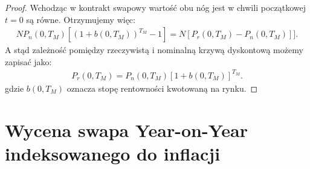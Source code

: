 \documentclass{mini}
\theoremstyle{mythstyle}
\begin{document}
	\begin{proof}
		Wchodząc w kontrakt swapowy wartość obu nóg jest w chwili początkowej $t = 0$ są równe. Otrzymujemy więc:
		\begin{eqnarray*}
			N P_n(0,T_M)[(1 + b(0,T_M))^{T_M} - 1] = N [P_r(0,T_M) - P_n(0,T_M)]].
		\end{eqnarray*}
		A stąd zależność pomiędzy rzeczywistą i nominalną krzywą dyskontową możemy zapisać jako:
		\begin{eqnarray}
		P_r(0,T_M) = P_n(0,T_M)[1 + b(0,T_M)]^{T_M}.
		\end{eqnarray}
		gdzie $b(0,T_M)$ oznacza stopę rentowności kwotowaną na rynku.
	\end{proof}

	\section{Wycena swapa Year-on-Year indeksowanego do inflacji}
		
\end{document}
